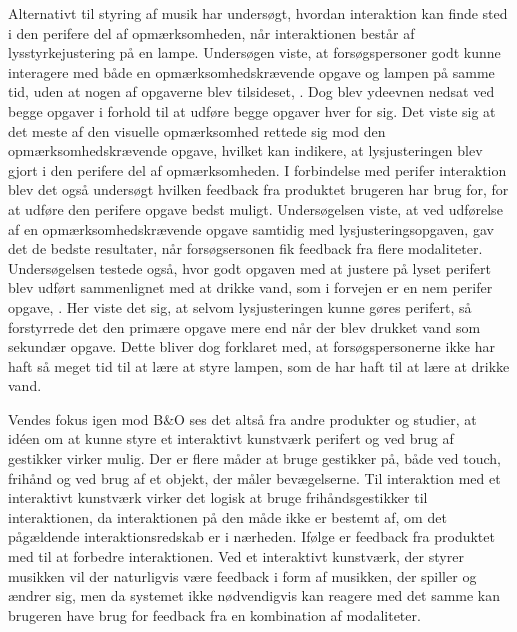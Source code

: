  Alternativt til styring af musik har \textcite[s. 1]{PDF:FacilitatingPIDesignAndEvaluation} undersøgt, hvordan interaktion kan finde sted i den perifere del af opmærksomheden, når interaktionen består af lysstyrkejustering på en lampe. Undersøgen viste, at forsøgspersoner godt kunne interagere med både en opmærksomhedskrævende opgave og lampen på samme tid, uden at nogen af opgaverne blev tilsideset, \parencite[ss. 20-21]{PDF:FacilitatingPIDesignAndEvaluation}. Dog blev ydeevnen nedsat ved begge opgaver i forhold til at udføre begge opgaver hver for sig. Det viste sig at det meste af den visuelle opmærksomhed rettede sig mod den opmærksomhedskrævende opgave, hvilket kan indikere, at lysjusteringen blev gjort i den perifere del af opmærksomheden. I forbindelse med perifer interaktion blev det også undersøgt hvilken feedback fra produktet brugeren har brug for, for at udføre den perifere opgave bedst muligt. Undersøgelsen viste, at ved udførelse af en opmærksomhedskrævende opgave samtidig med lysjusteringsopgaven, gav det de bedste resultater, når forsøgsersonen fik feedback fra flere modaliteter.  Undersøgelsen testede også, hvor godt opgaven med at justere på lyset perifert blev udført sammenlignet med at drikke vand, som i forvejen er en nem perifer opgave, \parencite[s. 20]{PDF:FacilitatingPIDesignAndEvaluation}. Her viste det sig, at selvom lysjusteringen kunne gøres perifert, så forstyrrede det den primære opgave mere end når der blev drukket vand som sekundær opgave. Dette bliver dog forklaret med, at forsøgspersonerne ikke har haft så meget tid til at lære at styre lampen, som de har haft til at lære at drikke vand. 
 
Vendes fokus igen mod B$\&$O ses det altså fra andre produkter og studier, at idéen om at kunne styre et interaktivt kunstværk perifert og ved brug af gestikker virker mulig. Der er flere måder at bruge gestikker på, både ved touch, frihånd og ved brug af et objekt, der måler bevægelserne. Til interaktion med et interaktivt kunstværk virker det logisk at bruge frihåndsgestikker til interaktionen, da interaktionen på den måde ikke er bestemt af, om det pågældende interaktionsredskab er i nærheden. Ifølge \textcite[s. 21]{PDF:FacilitatingPIDesignAndEvaluation} er feedback fra produktet med til at forbedre interaktionen. Ved et interaktivt kunstværk, der styrer musikken vil der naturligvis være feedback i form af musikken, der spiller og ændrer sig, men da systemet ikke nødvendigvis kan reagere med det samme kan brugeren have brug for feedback fra en kombination af modaliteter. 

